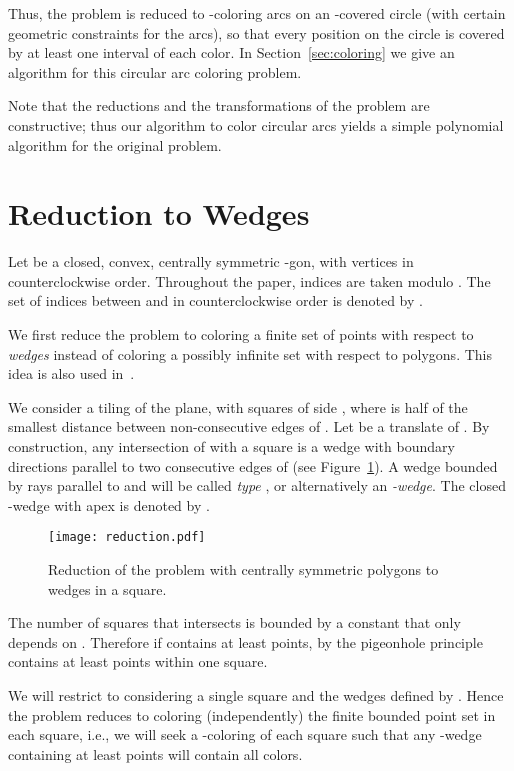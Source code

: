 \documentclass[english,11pt]{article}
\begin{document}
Thus, the problem is reduced to -coloring arcs on an -covered circle (with certain geometric constraints for the arcs), so that every position on the circle is covered by at least one interval of each color. In Section~\ref{sec:coloring} we give an algorithm for  this circular arc coloring problem. 

 Note that the reductions and the transformations of the problem are constructive; thus our algorithm to color circular arcs yields a simple polynomial algorithm for the original problem. 

\section{Reduction to Wedges}\label{sec:prel}

Let  be a closed, convex,  centrally symmetric
-gon, with vertices  in counterclockwise
order. Throughout the paper, indices are taken modulo . 
The set of indices between  and  in counterclockwise order is denoted by .\medskip


We first  reduce the problem to coloring a finite set of points with respect to {\em wedges} instead of coloring a possibly infinite set with respect to polygons. 
This idea is also used in~\cite{PT07,TT07}.


We consider a tiling of the plane, with squares of side
, where  is half of the smallest distance
between non-consecutive edges of .
Let  be a translate of .
By construction, any intersection of  with a  square is a
wedge
with boundary directions parallel to two consecutive edges of 
(see Figure~\ref{fig:reduc}).
A wedge bounded by rays parallel to  and
 will be called  {\em type} , or alternatively an {\em -wedge}. 
The closed -wedge with apex  is denoted by . 

\begin{figure}[htb]
\begin{center}
\texttt{[image: reduction.pdf]}
\end{center}
\caption{\label{fig:reduc} Reduction of the problem with centrally symmetric polygons to wedges in a square.}
\end{figure}

The number of squares that  intersects is bounded by
a constant  that only depends on . Therefore if  contains at least  points,  by the
pigeonhole principle  contains at least  points within one square. 


We will restrict to considering a single square and
the  wedges defined by . Hence the problem reduces to coloring (independently) the finite bounded point set  in each square, i.e., we will seek a -coloring of each square such that any -wedge
containing at least  points will contain all  colors.\medskip
\end{document}
